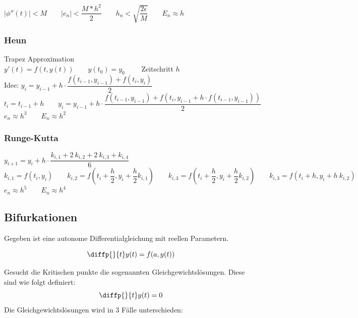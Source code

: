 $|\phi''(t)|<M \qquad |e_n| < \dfrac{M*h^2}{2} \qquad
h_n < \sqrt{\dfrac{2\epsilon}{M}} \qquad E_n \approx h$
\subsubsection{Heun}
Trapez Approximation\\
$y'(t)=f(t,y(t)) \qquad y(t_0)=y_0 \qquad$ Zeitschritt $h$\\
Idee: $y_i=y_{i-1} + h \cdot \dfrac{f(t_{i-1},y_{i-1}) + f(t_{i},y_{i})}{2}$\\
$t_i = t_{i-1} + h \qquad 
y_i = y_{i-1} + h \cdot \dfrac{f(t_{i-1},y_{i-1}) + f(t_{i},y_{i-1} + h \cdot f(t_{i-1},y_{i-1}))}{2}$\\
$e_n \approx h^3 \qquad E_n \approx h^2$
\subsubsection{Runge-Kutta}
$y_{i+1}=y_i + h \cdot \dfrac{k_{i,1} + 2\:k_{i,2} + 2\:k_{i,3} + k_{i,4} }{6}$\\
$k_{i,1} = f(t_{i},y_{i}) \qquad 
k_{i,2} = f(t_{i} + \dfrac{h}{2},y_{i} + \dfrac{h}{2}k_{i,1}) \qquad 
k_{i,3} = f(t_{i} + \dfrac{h}{2},y_{i} + \dfrac{h}{2}k_{i,2}) \qquad 
k_{i,3} = f(t_{i} + h,y_{i} + h \: k_{i,2}) \qquad$\\
$e_n \approx h^5 \qquad E_n \approx h^4$
\subsection{Bifurkationen}
Gegeben ist eine autonome Differentialgleichung mit reellen Parametern.

\begin{equation*}
	\diffp{}{t}y(t) = f(a,y(t))
\end{equation*}

Gesucht die Kritischen punkte die sogenannten Gleichgewichtslösungen. Diese sind wie folgt definiert:
\begin{equation*}
	\diffp{}{t}y(t) = 0
\end{equation*}
Die Gleichgewichtslösungen wird in 3 Fälle unterschieden:\\

